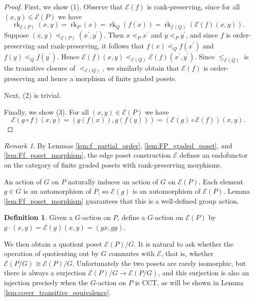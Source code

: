 \documentclass[smallextended, envcountsame, numbook]{svjour3}
\theoremstyle{plain}
\theoremstyle{definition}
\newtheorem{defn}[thm]{Definition}
\theoremstyle{remark}
\newtheorem{rmk}[thm]{Remark}
\numberwithin{equation}{section}
\newcommand\rk{\operatorname{rk}}
\begin{document}
\begin{proof}
First, we show (1).
Observe that $\mathcal E(f)$ is rank-preserving, since for all $(x, y)\in \mathcal E(P)$ we have 
$$\rk_{\mathcal E(P)}(x, y) = \rk_P(x) = \rk_Q(f(x)) = \rk_{\mathcal E(Q)}(\mathcal E(f)(x, y)).$$
Suppose $(x, y)\lessdot_{\mathcal E(P)} (x^\prime, y^\prime)$.  Then $x\lessdot_P x^\prime$ and $y\lessdot_P y^\prime$, and since $f$ is order-preserving and rank-preserving, it follows that $f(x)\lessdot_Q f(x^\prime)$ and $f(y)\lessdot_Q f(y^\prime)$. Hence $\mathcal E(f)(x,y) \lessdot_{\mathcal E(Q)} \mathcal E(f)(x^\prime , y^\prime)$. Since $\le_{\mathcal E(Q)}$ is the transitive closure of $\lessdot_{\mathcal E(Q)}$, we similarly obtain that $\mathcal E(f)$ is order-preserving and hence a morphism of finite graded posets.

Next, (2) is trivial.

Finally, we show (3). For all $(x, y)\in \mathcal E(P)$ we have 
$$\mathcal E(g\circ f)(x, y) = (g(f(x)), g(f(y))) = \left(\mathcal E(g)\circ\mathcal E(f)\right)(x, y).$$
\end{proof}

\begin{rmk}
By Lemmas \ref{lem:f_partial_order}, \ref{lem:FP_graded_poset}, and \ref{lem:Ff_poset_morphism}, the edge poset construction $\mathcal{E}$ defines an endofunctor on the category of finite graded posets with rank-preserving morphisms.
\end{rmk}



An action of $G$ on $P$ naturally induces an action of $G$ on $\mathcal E(P).$ Each element $g \in G$ is an automorphism of $P$, so $\mathcal E(g)$ is an automorphism of $\mathcal E(P)$. Lemma \ref{lem:Ff_poset_morphism} guarantees that this is a well-defined group action. 


\begin{defn}\label{note:G_action_on_FP}
Given a $G$-action on $P$, define a $G$-action on $\mathcal E(P)$ by $g\cdot (x,y) = \mathcal{E}(g)(x,y) = (gx,gy)$.
\end{defn}

We then obtain a quotient poset $\mathcal E(P)/G$.  It is natural to ask whether the operation of quotienting out by $G$ commutes with $\mathcal E$, that is, whether $\mathcal E(P/G) \cong \mathcal E(P)/G$.  Unfortunately the two posets are rarely isomorphic, but there is always a surjection $\mathcal E(P)/G\rightarrow \mathcal E(P/G)$, and this surjection is also an injection precisely when the $G$-action on $P$ is CCT, as will be shown in Lemma \ref{lem:cover_transitive_equivalence}.
\end{document}
